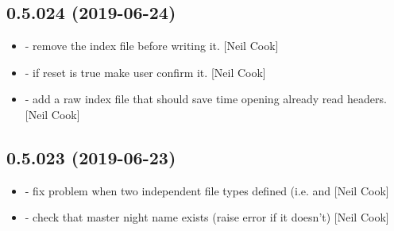 \documentclass[a4paper,10pt,english]{report}
\begin{document}
\subsection{0.5.024 (2019-06-24)}
\label{\detokenize{misc/changelog:id112}}\begin{itemize}
\item {} 
 - remove the index file before writing it. {[}Neil Cook{]}

\item {} 
 - if reset is true make user confirm it. {[}Neil Cook{]}

\item {} 
 - add a raw index file that should save time opening
already read headers. {[}Neil Cook{]}

\end{itemize}


\subsection{0.5.023 (2019-06-23)}
\label{\detokenize{misc/changelog:id113}}\begin{itemize}
\item {} 
 - fix problem when two independent file types defined
(i.e.  and  {[}Neil Cook{]}

\item {} 
 - check that master night name exists (raise error if it
doesn’t) {[}Neil Cook{]}

\end{itemize}
\end{document}
